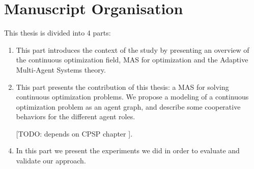 \section*{Manuscript Organisation}
This thesis is divided into 4 parts:
\begin{enumerate}[P{a}rt I.] %
\item This part introduces the context of the study by presenting an overview of the continuous optimization field, MAS for optimization and the Adaptive Multi-Agent Systems theory.
\item This part presents the contribution of this thesis: a MAS for solving continuous optimization problems. We propose a modeling of a continuous optimization problem as an agent graph, and describe some cooperative behaviors for the different agent roles.
\item [[TODO: depends on CPSP chapter]].
\item In this part we present the experiments we did in order to evaluate and validate our approach.
\end{enumerate}